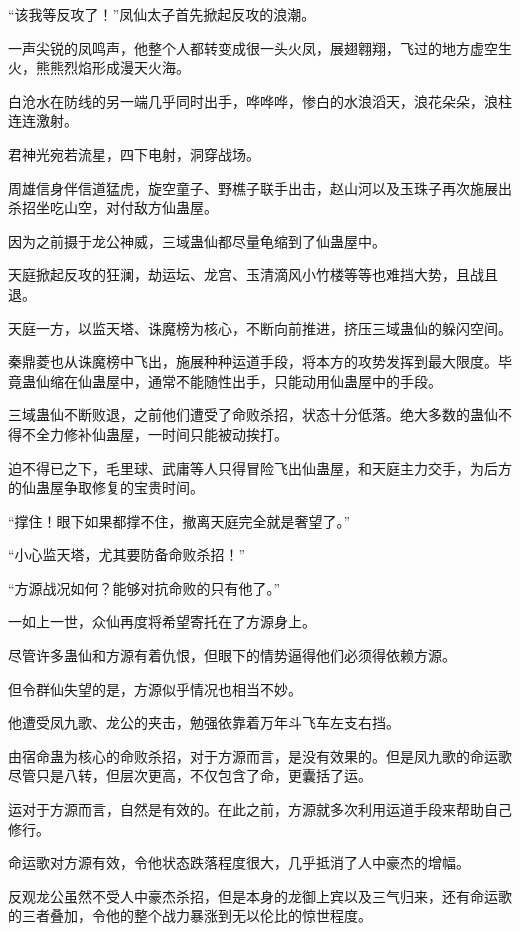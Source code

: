 \begin{this_body}
“该我等反攻了！”凤仙太子首先掀起反攻的浪潮。

一声尖锐的凤鸣声，他整个人都转变成很一头火凤，展翅翱翔，飞过的地方虚空生火，熊熊烈焰形成漫天火海。

白沧水在防线的另一端几乎同时出手，哗哗哗，惨白的水浪滔天，浪花朵朵，浪柱连连激射。

君神光宛若流星，四下电射，洞穿战场。

周雄信身伴信道猛虎，旋空童子、野樵子联手出击，赵山河以及玉珠子再次施展出杀招坐吃山空，对付敌方仙蛊屋。

因为之前摄于龙公神威，三域蛊仙都尽量龟缩到了仙蛊屋中。

天庭掀起反攻的狂澜，劫运坛、龙宫、玉清滴风小竹楼等等也难挡大势，且战且退。

天庭一方，以监天塔、诛魔榜为核心，不断向前推进，挤压三域蛊仙的躲闪空间。

秦鼎菱也从诛魔榜中飞出，施展种种运道手段，将本方的攻势发挥到最大限度。毕竟蛊仙缩在仙蛊屋中，通常不能随性出手，只能动用仙蛊屋中的手段。

三域蛊仙不断败退，之前他们遭受了命败杀招，状态十分低落。绝大多数的蛊仙不得不全力修补仙蛊屋，一时间只能被动挨打。

迫不得已之下，毛里球、武庸等人只得冒险飞出仙蛊屋，和天庭主力交手，为后方的仙蛊屋争取修复的宝贵时间。

“撑住！眼下如果都撑不住，撤离天庭完全就是奢望了。”

“小心监天塔，尤其要防备命败杀招！”

“方源战况如何？能够对抗命败的只有他了。”

一如上一世，众仙再度将希望寄托在了方源身上。

尽管许多蛊仙和方源有着仇恨，但眼下的情势逼得他们必须得依赖方源。

但令群仙失望的是，方源似乎情况也相当不妙。

他遭受凤九歌、龙公的夹击，勉强依靠着万年斗飞车左支右挡。

由宿命蛊为核心的命败杀招，对于方源而言，是没有效果的。但是凤九歌的命运歌尽管只是八转，但层次更高，不仅包含了命，更囊括了运。

运对于方源而言，自然是有效的。在此之前，方源就多次利用运道手段来帮助自己修行。

命运歌对方源有效，令他状态跌落程度很大，几乎抵消了人中豪杰的增幅。

反观龙公虽然不受人中豪杰杀招，但是本身的龙御上宾以及三气归来，还有命运歌的三者叠加，令他的整个战力暴涨到无以伦比的惊世程度。


\end{this_body}
